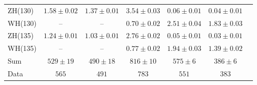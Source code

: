 \documentclass[12pt,twoside,a4paper,cmspaper,final,collab]{cms-tdr}
\begin{document}
\begin{table}[tbp]
\begin{center}
{\begin{tabular}{lcccccc}
ZH(130) & $1.58 \pm 0.02$ & $1.37 \pm 0.01$ & $3.54\pm 0.03$ & $0.06\pm 0.01$ & $0.04\pm 0.01$ \\
WH(130) & -- & -- & $0.70\pm 0.02$ & $2.51\pm 0.04$ & $1.83\pm 0.03$   \\
ZH(135) & $1.24 \pm 0.01$ & $1.03 \pm 0.01$ & $2.76\pm 0.02$ & $0.05\pm 0.01$ & $0.03\pm 0.01$ \\
WH(135) & -- & -- & $0.77\pm 0.02$ & $1.94\pm 0.03$ & $1.39\pm 0.02$   \\
\hline
Sum & $529 \pm 19$ & $490 \pm 18$ & $816 \pm 10$ & $575\pm 6$ & $386\pm 6$ \\\hline
Data &    $565$ &   $491$ & $783$ & $551$& $383$ \\\hline
\end{tabular}
}
\end{center}
\end{table}
\end{document}

